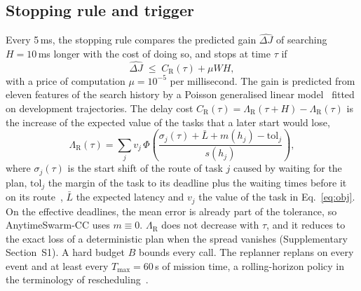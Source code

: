 \subsection{Stopping rule and trigger}\label{sec:stop}
Every 5\,ms, the stopping rule compares the predicted gain $\widehat{\Delta J}$ of searching $H=10$\,ms longer with the
cost of doing so, and stops at time $\tau$ if
\begin{equation}\label{eq:stop}
\widehat{\Delta J}\;\le\;C_{\mathrm{R}}(\tau)+\mu W H ,
\end{equation}
with a price of computation $\mu=10^{-5}$ per millisecond. The gain is predicted from eleven features of the search
history by a Poisson generalised linear model~\cite{mccullagh1989glm} fitted on development trajectories. The delay
cost $C_{\mathrm{R}}(\tau)=\Lambda_{\mathrm{R}}(\tau+H)-\Lambda_{\mathrm{R}}(\tau)$ is the increase of the expected value
of the tasks that a later start would lose,
\begin{equation}\label{eq:risk}
\Lambda_{\mathrm{R}}(\tau)=\sum_j v_j\,\Phi\!\left(\frac{\sigma_j(\tau)+\bar L+m(h_j)-\mathrm{tol}_j}{s(h_j)}\right),
\end{equation}
where $\sigma_j(\tau)$ is the start shift of the route of task $j$ caused by waiting for the plan, $\mathrm{tol}_j$ the
margin of the task to its deadline plus the waiting times before it on its route~\cite{savelsbergh1992vrptw}, $\bar L$
the expected latency and $v_j$ the value of the task in Eq.~\eqref{eq:obj}. On the effective deadlines, the mean error
is already part of the tolerance, so AnytimeSwarm-CC uses $m\equiv0$. $\Lambda_{\mathrm{R}}$ does not decrease with
$\tau$, and it reduces to the exact loss of a deterministic plan when the spread vanishes (Supplementary
Section~S1). A hard budget $B$ bounds every call. The replanner replans on every event and at least every
$T_{\max}=60$\,s of mission time, a rolling-horizon policy in the terminology of
rescheduling~\cite{vieira2003rescheduling,ouelhadj2009survey}.
